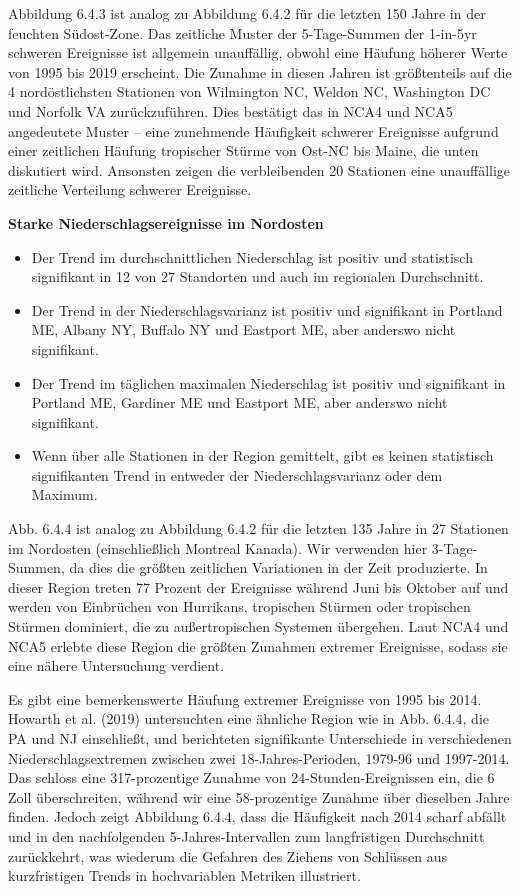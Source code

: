 \documentclass[12pt,paper=a4,DIV=12,parskip=never,chapterprefix=false,headings=standardclasses]{scrreprt}
\begin{document}
Abbildung 6.4.3 ist analog zu Abbildung 6.4.2 für die letzten 150 Jahre in der feuchten Südost-Zone. Das zeitliche Muster der 5-Tage-Summen der 1-in-5yr schweren Ereignisse ist allgemein unauffällig, obwohl eine Häufung höherer Werte von 1995 bis 2019 erscheint. Die Zunahme in diesen Jahren ist größtenteils auf die 4 nordöstlichsten Stationen von Wilmington NC, Weldon NC, Washington DC und Norfolk VA zurückzuführen. Dies bestätigt das in NCA4 und NCA5 angedeutete Muster -- eine zunehmende Häufigkeit schwerer Ereignisse aufgrund einer zeitlichen Häufung tropischer Stürme von Ost-NC bis Maine, die unten diskutiert wird. Ansonsten zeigen die verbleibenden 20 Stationen eine unauffällige zeitliche Verteilung schwerer Ereignisse.

\textbf{Starke Niederschlagsereignisse im Nordosten}
\begin{itemize}
\item Der Trend im durchschnittlichen Niederschlag ist positiv und statistisch signifikant in 12 von 27 Standorten und auch im regionalen Durchschnitt. 
\item Der Trend in der Niederschlagsvarianz ist positiv und signifikant in Portland ME, Albany NY, Buffalo NY und Eastport ME, aber anderswo nicht signifikant. 
\item Der Trend im täglichen maximalen Niederschlag ist positiv und signifikant in Portland ME, Gardiner ME und Eastport ME, aber anderswo nicht signifikant. 
\item Wenn über alle Stationen in der Region gemittelt, gibt es keinen statistisch signifikanten Trend in entweder der Niederschlagsvarianz oder dem Maximum. 
\end{itemize}




Abb. 6.4.4 ist analog zu Abbildung 6.4.2 für die letzten 135 Jahre in 27 Stationen im Nordosten (einschließlich Montreal Kanada). Wir verwenden hier 3-Tage-Summen, da dies die größten zeitlichen Variationen in der Zeit produzierte. In dieser Region treten 77 Prozent der Ereignisse während Juni bis Oktober auf und werden von Einbrüchen von Hurrikans, tropischen Stürmen oder tropischen Stürmen dominiert, die zu außertropischen Systemen übergehen. Laut NCA4 und NCA5 erlebte diese Region die größten Zunahmen extremer Ereignisse, sodass sie eine nähere Untersuchung verdient.

Es gibt eine bemerkenswerte Häufung extremer Ereignisse von 1995 bis 2014. Howarth et al. (2019) untersuchten eine ähnliche Region wie in Abb. 6.4.4, die PA und NJ einschließt, und berichteten signifikante Unterschiede in verschiedenen Niederschlagsextremen zwischen zwei 18-Jahres-Perioden, 1979-96 und 1997-2014. Das schloss eine 317-prozentige Zunahme von 24-Stunden-Ereignissen ein, die 6 Zoll überschreiten, während wir eine 58-prozentige Zunahme über dieselben Jahre finden. Jedoch zeigt Abbildung 6.4.4, dass die Häufigkeit nach 2014 scharf abfällt und in den nachfolgenden 5-Jahres-Intervallen zum langfristigen Durchschnitt zurückkehrt, was wiederum die Gefahren des Ziehens von Schlüssen aus kurzfristigen Trends in hochvariablen Metriken illustriert.
\end{document}
